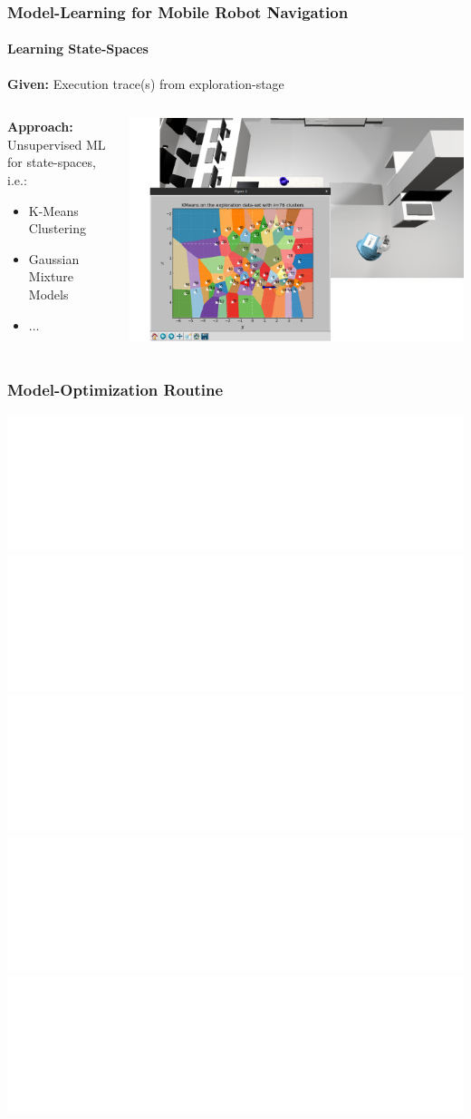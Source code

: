 \begin{frame}
	\frametitle{Model-Learning for Mobile Robot Navigation}
	\framesubtitle{Learning State-Spaces}
	\textbf{Given:} Execution trace(s) from exploration-stage

	\begin{columns}[T]
		\begin{column}{0.4\textwidth}
			\vspace{12pt}
			\pause
			\textbf{Approach:} Unsupervised ML for state-spaces, i.e.:
			\begin{itemize}
				\item<3-> K-Means Clustering
				\item<3-> Gaussian Mixture Models
				\item<3-> $\ldots$
			\end{itemize}
			\vspace{12pt}
		\end{column}
		\begin{column}{0.525\textwidth}
			\includegraphics[width=1\textwidth]{figures/simulation_learn_2}
		\end{column}
	\end{columns}
\end{frame}

\begin{frame}
\frametitle{Model-Optimization Routine}
\begin{center}
\includegraphics<1| handout:0>[width=1\textwidth]{figures/optimization-routine/learning-cycle-1.pdf}
\includegraphics<2| handout:0>[width=1\textwidth]{figures/optimization-routine/learning-cycle-2.pdf}
\includegraphics<3| handout:0>[width=1\textwidth]{figures/optimization-routine/learning-cycle-3.pdf}
\includegraphics<4| handout:0>[width=1\textwidth]{figures/optimization-routine/learning-cycle-4.pdf}
\includegraphics<5>[width=1\textwidth]{figures/optimization-routine/learning-cycle-5.pdf}
\end{center}
\end{frame}

